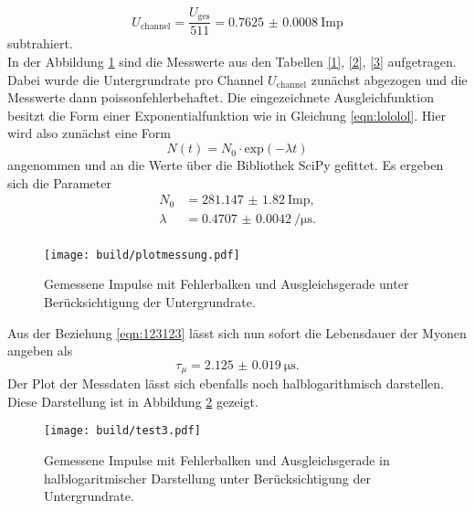 \begin{equation*}
    U_{\text{channel}} = \frac{U_{\text{ges}}}{511} = \SI{0.7625(8)}{\text{Imp}}
\end{equation*}
subtrahiert.
\\
In der Abbildung \ref{fig:mess} sind die Messwerte aus den Tabellen \ref{1}, \ref{2}, \ref{3} aufgetragen. Dabei wurde die Untergrundrate pro Channel $U_{\text{channel}}$ zunächst abgezogen und die Messwerte dann
poissonfehlerbehaftet. Die eingezeichnete Ausgleichfunktion besitzt die Form einer Exponentialfunktion wie in Gleichung \ref{eqn:lololol}. Hier wird also zunächst eine Form 
\begin{equation*}
N(t) = N_0 \cdot \text{exp}(-\lambda t)
\end{equation*}
angenommen und an die Werte über die Bibliothek SciPy \cite{scipy} gefittet.
Es ergeben sich die Parameter
\begin{align*}
    N_0 &= \SI{281.147(1820)}{{\text{Imp}}},\\
    \lambda &= \SI{0.4707(42)}{\per\micro\second}.\\
\end{align*}
\begin{figure}
    \centering
    \texttt{[image: build/plotmessung.pdf]}
    \caption{Gemessene Impulse mit Fehlerbalken und Ausgleichsgerade unter Berücksichtigung der Untergrundrate.} 
    \label{fig:mess}
\end{figure}
Aus der Beziehung \ref{eqn:123123} lässt sich nun sofort die Lebensdauer der Myonen angeben als
\begin{equation}
\tau_{\mu} = \SI{2.125(19)}{\micro\second}.
\end{equation}
Der Plot der Messdaten lässt sich ebenfalls noch halblogarithmisch darstellen. Diese Darstellung ist in Abbildung \ref{fig:lol123} gezeigt.
\begin{figure}
    \centering
    \texttt{[image: build/test3.pdf]}
    \caption{Gemessene Impulse mit Fehlerbalken und Ausgleichsgerade in halblogaritmischer Darstellung unter Berücksichtigung der Untergrundrate.} 
    \label{fig:lol123}
\end{figure}

